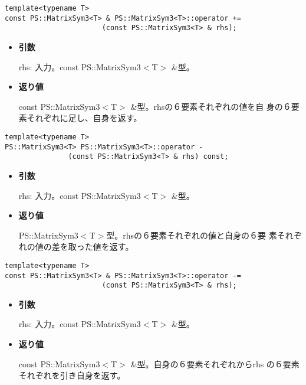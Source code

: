 \begin{screen}
\begin{verbatim}
template<typename T>
const PS::MatrixSym3<T> & PS::MatrixSym3<T>::operator += 
                       (const PS::MatrixSym3<T> & rhs);
\end{verbatim}
\end{screen}

\begin{itemize}

\item{{\bf 引数}}

{rhs}: 入力。{const PS::MatrixSym3$<$T$>$ \&}型。

\item{{\bf 返り値}}

{const PS::MatrixSym3$<$T$>$ \&}型。{rhs}の６要素それぞれの値を自
身の６要素それぞれに足し、自身を返す。

\end{itemize}

\begin{screen}
\begin{verbatim}
template<typename T>
PS::MatrixSym3<T> PS::MatrixSym3<T>::operator - 
               (const PS::MatrixSym3<T> & rhs) const;
\end{verbatim}
\end{screen}

\begin{itemize}

\item{{\bf 引数}}

{rhs}: 入力。{const PS::MatrixSym3$<$T$>$ \&}型。

\item{{\bf 返り値}}

{PS::MatrixSym3$<$T$>$}型。{rhs}の６要素それぞれの値と自身の６要
素それぞれの値の差を取った値を返す。

\end{itemize}

\begin{screen}
\begin{verbatim}
template<typename T>
const PS::MatrixSym3<T> & PS::MatrixSym3<T>::operator -= 
                       (const PS::MatrixSym3<T> & rhs);
\end{verbatim}
\end{screen}

\begin{itemize}

\item{{\bf 引数}}

{rhs}: 入力。{const PS::MatrixSym3$<$T$>$ \&}型。

\item{{\bf 返り値}}

{const PS::MatrixSym3$<$T$>$ \&}型。自身の６要素それぞれから{rhs}
の６要素それぞれを引き自身を返す。

\end{itemize}

